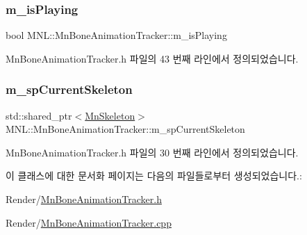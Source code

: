 \mbox{\label{class_m_n_l_1_1_mn_bone_animation_tracker_ac5dad518bde253882bda51dd30240d14}} 
\subsubsection{\texorpdfstring{m\+\_\+is\+Playing}{m\_isPlaying}}
{\footnotesize\ttfamily bool M\+N\+L\+::\+Mn\+Bone\+Animation\+Tracker\+::m\+\_\+is\+Playing\hspace{0.3cm}{\ttfamily [private]}}



Mn\+Bone\+Animation\+Tracker.\+h 파일의 43 번째 라인에서 정의되었습니다.

\mbox{\label{class_m_n_l_1_1_mn_bone_animation_tracker_aefec935ed7824231963b657b8ddb914b}} 
\subsubsection{\texorpdfstring{m\+\_\+sp\+Current\+Skeleton}{m\_spCurrentSkeleton}}
{\footnotesize\ttfamily std\+::shared\+\_\+ptr$<$\hyperlink{class_m_n_l_1_1_mn_skeleton}{Mn\+Skeleton}$>$ M\+N\+L\+::\+Mn\+Bone\+Animation\+Tracker\+::m\+\_\+sp\+Current\+Skeleton\hspace{0.3cm}{\ttfamily [private]}}



Mn\+Bone\+Animation\+Tracker.\+h 파일의 30 번째 라인에서 정의되었습니다.



이 클래스에 대한 문서화 페이지는 다음의 파일들로부터 생성되었습니다.\+:\begin{DoxyCompactItemize}
\item 
Render/\hyperlink{_mn_bone_animation_tracker_8h}{Mn\+Bone\+Animation\+Tracker.\+h}\item 
Render/\hyperlink{_mn_bone_animation_tracker_8cpp}{Mn\+Bone\+Animation\+Tracker.\+cpp}\end{DoxyCompactItemize}
